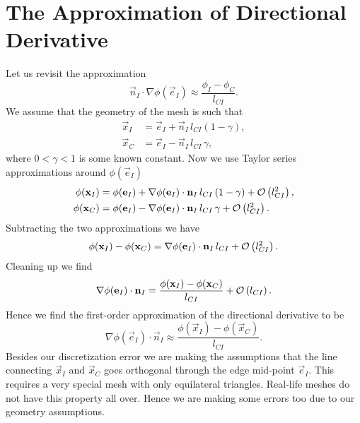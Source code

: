 \documentclass[preprint,nocopyrightspace]{sigplanconf}
\begin{document}
\section{The Approximation of Directional Derivative}
\label{sec:appr-direct-deriv}
Let us revisit the approximation
\begin{equation}
  \vec n_I \cdot \nabla \phi(\vec e_I) \approx \frac{  \phi_I - \phi_C  }{ l_{CI}}.
\end{equation}
We assume that the geometry of the mesh is such that
\begin{subequations}
\begin{align}
  \vec x_I &=  \vec e_I  + \vec n_I \, l_{CI}\left(1-\gamma\right),\\
  \vec x_C &=  \vec e_I - \vec n_I \, l_{CI}  \, \gamma,
\end{align}  
\end{subequations}
where $0 < \gamma < 1$ is some known constant. Now we use Taylor series approximations around
$\phi(\vec e_I)$
\begin{subequations}
\begin{align}
  \phi(\mathbf{x} _I) &=  \phi(\mathbf{e} _I)  +  \nabla \phi(\mathbf{e} _I) \cdot
  \mathbf{n} _I \, l_{CI} \left(1-\gamma\right) +  \mathcal{O} \left(  l_{CI}^2 \right), \\
  \phi(\mathbf{x} _C) &=  \phi(\mathbf{e} _I)  -  \nabla \phi(\mathbf{e} _I) \cdot
  \mathbf{n} _I \, l_{CI}  \, \gamma +  \mathcal{O} \left(  l_{CI}^2 \right).
\end{align}  
\end{subequations}
Subtracting the two approximations we have
\begin{equation}
  \phi(\mathbf{x} _I) -  \phi(\mathbf{x} _C) =   \nabla \phi(\mathbf{e} _I) \cdot
  \mathbf{n} _I \, l_{CI} +  \mathcal{O} \left(  l_{CI}^2 \right).
\end{equation}
Cleaning up we find
\begin{equation}
  \nabla \phi(\mathbf{e} _I) \cdot \mathbf{n} _I 
  =
  \frac{
    \phi(\mathbf{x} _I) -  \phi(\mathbf{x} _C)
  }{l_{CI}} +  \mathcal{O} \left(  l_{CI} \right). 
\end{equation}
Hence we find the first-order approximation of the directional
derivative to be
\begin{equation}
  \nabla \phi(\vec e_I) \cdot \vec n_I 
  \approx
  \frac{
    \phi(\vec x_I) -  \phi(\vec x_C)
  }{l_{CI}} .
\end{equation}
Besides our discretization error we are making the assumptions that
the line connecting $\vec x_I$ and $\vec x_C$ goes orthogonal through
the edge mid-point $\vec e_I$. This requires a very special mesh with
only equilateral triangles. Real-life meshes do not have this property
all over. Hence we are making some errors too due to our geometry
assumptions.
\end{document}
